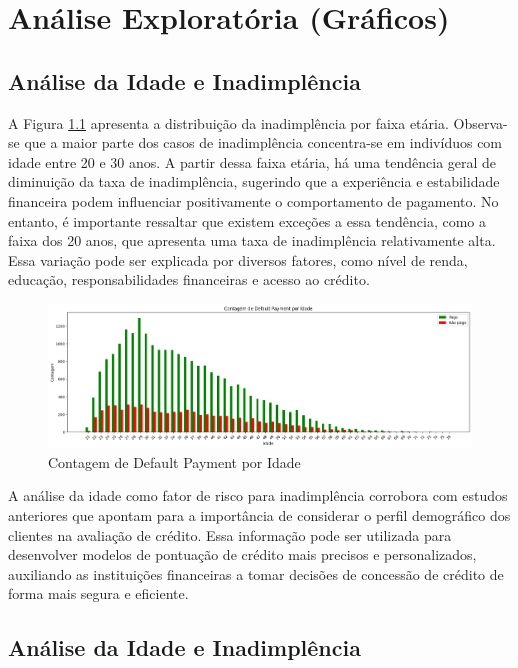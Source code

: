 \documentclass{abntpuc}
\begin{document}
\chapter{Análise Exploratória (Gráficos)}
\section{Análise da Idade e Inadimplência}

A Figura \ref{fig:grafico1} apresenta a distribuição da inadimplência por faixa etária. Observa-se que a maior parte dos casos de inadimplência concentra-se em indivíduos com idade entre 20 e 30 anos. A partir dessa faixa etária, há uma tendência geral de diminuição da taxa de inadimplência, sugerindo que a experiência e estabilidade financeira podem influenciar positivamente o comportamento de pagamento. No entanto, é importante ressaltar que existem exceções a essa tendência, como a faixa dos 20 anos, que apresenta uma taxa de inadimplência relativamente alta. Essa variação pode ser explicada por diversos fatores, como nível de renda, educação, responsabilidades financeiras e acesso ao crédito.

\begin{figure}[H]
    \centering
    \includegraphics[width=\textwidth]{grafico1.png}
    \caption{Contagem de Default Payment por Idade}
    \label{fig:grafico1}
\end{figure}

A análise da idade como fator de risco para inadimplência corrobora com estudos anteriores que apontam para a importância de considerar o perfil demográfico dos clientes na avaliação de crédito. Essa informação pode ser utilizada para desenvolver modelos de pontuação de crédito mais precisos e personalizados, auxiliando as instituições financeiras a tomar decisões de concessão de crédito de forma mais segura e eficiente.

\section{Análise da Idade e Inadimplência}
\end{document}
